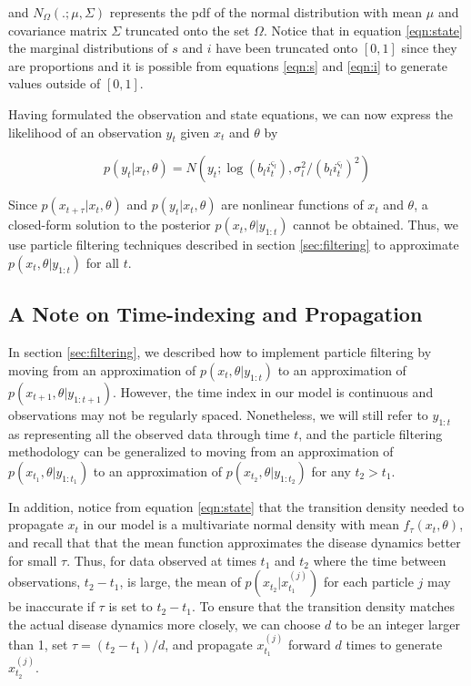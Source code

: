 \documentclass{article}
\begin{document}
\noindent and $N_{\Omega}(.;\mu,\Sigma)$ represents the pdf of the normal distribution with mean $\mu$ and covariance matrix $\Sigma$ truncated onto the set $\Omega$.  Notice that in equation \eqref{eqn:state} the marginal distributions of $s$ and $i$ have been truncated onto $[0,1]$ since they are proportions and it is possible from equations \eqref{eqn:s} and \eqref{eqn:i} to generate values outside of $[0,1]$.

Having formulated the observation and state equations, we can now express the likelihood of an observation $y_t$ given $x_t$ and $\theta$ by

\begin{equation}
p\left(y_t\left|x_t,\theta\right.\right) = N\left(y_t;\log(b_li_t^{\varsigma_l}),\sigma_l^2 / (b_li_t^{\varsigma_l})^2\right) \label{eqn:lik}
\end{equation}

Since $p(x_{t+\tau}|x_t,\theta)$ and $p(y_t|x_t,\theta)$ are nonlinear functions of $x_t$ and $\theta$, a closed-form solution to the posterior $p(x_t,\theta|y_{1:t})$ cannot be obtained.  Thus, we use particle filtering techniques described in section \ref{sec:filtering} to approximate $p(x_t,\theta|y_{1:t})$ for all $t$.

\subsection{A Note on Time-indexing and Propagation}

In section \ref{sec:filtering}, we described how to implement particle filtering by moving from an approximation of $p(x_t,\theta|y_{1:t})$ to an approximation of $p(x_{t+1},\theta|y_{1:t+1})$.  However, the time index in our model is continuous and observations may not be regularly spaced.  Nonetheless, we will still refer to $y_{1:t}$ as representing all the observed data through time $t$, and the particle filtering methodology can be generalized to moving from an approximation of $p(x_{t_1},\theta|y_{1:t_1})$ to an approximation of $p(x_{t_2},\theta|y_{1:t_2})$ for any $t_2 > t_1$.

In addition, notice from equation \eqref{eqn:state} that the transition density needed to propagate $x_t$ in our model is a multivariate normal density with mean $f_\tau(x_t,\theta)$, and recall that that the mean function approximates the disease dynamics better for small $\tau$.  Thus, for data observed at times $t_1$ and $t_2$ where the time between observations, $t_2 - t_1$, is large, the mean of $p(x_{t_2}|x_{t_1}^{(j)})$ for each particle $j$ may be inaccurate if $\tau$ is set to $t_2 - t_1$.  To ensure that the transition density matches the actual disease dynamics more closely, we can choose $d$ to be an integer larger than 1, set $\tau = (t_2 - t_1) / d$, and propagate $x_{t_1}^{(j)}$ forward $d$ times to generate $x_{t_2}^{(j)}$.
\end{document}
